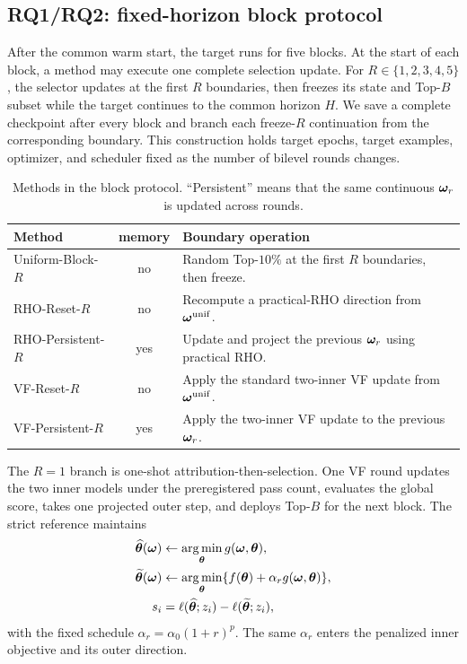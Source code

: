 \subsection{RQ1/RQ2: fixed-horizon block protocol}

After the common warm start, the target runs for five blocks. At the start of
each block, a method may execute one complete selection update. For
$R\in\{1,2,3,4,5\}$, the selector updates at the first $R$ boundaries, then
freezes its state and Top-$B$ subset while the target continues to the common
horizon $H$. We save a complete checkpoint after every block and branch each
freeze-$R$ continuation from the corresponding boundary. This construction
holds target epochs, target examples, optimizer, and scheduler fixed as the
number of bilevel rounds changes.

\begin{table}[h]
\centering
\caption{Methods in the block protocol. ``Persistent'' means that the same
continuous ${\bm{\omega}}_r$ is updated across rounds.}
\label{tab:block-methods}
\small
\begin{tabularx}{\textwidth}{l c X}
\toprule
Method & memory & Boundary operation \\
\midrule
Uniform-Block-$R$ & no & Random Top-$10\%$ at the first $R$ boundaries, then freeze. \\
RHO-Reset-$R$ & no & Recompute a practical-RHO direction from ${\bm{\omega}}^{\mathrm{unif}}$. \\
RHO-Persistent-$R$ & yes & Update and project the previous ${\bm{\omega}}_r$ using practical RHO. \\
VF-Reset-$R$ & no & Apply the standard two-inner VF update from ${\bm{\omega}}^{\mathrm{unif}}$. \\
VF-Persistent-$R$ & yes & Apply the two-inner VF update to the previous ${\bm{\omega}}_r$. \\
\bottomrule
\end{tabularx}
\end{table}

The $R=1$ branch is one-shot attribution-then-selection. One VF round updates
the two inner models under the preregistered pass count, evaluates the global
score, takes one projected outer step, and deploys Top-$B$ for the next block.
The strict reference maintains
\begin{align}
\widehat{{\bm{\theta}}}({\bm{\omega}})&\leftarrow\operatorname*{arg\,min}_{{\bm{\theta}}}g({\bm{\omega}},{\bm{\theta}}),\\
\widetilde{{\bm{\theta}}}({\bm{\omega}})&\leftarrow\operatorname*{arg\,min}_{{\bm{\theta}}}
\{f({\bm{\theta}})+\alpha_r g({\bm{\omega}},{\bm{\theta}})\},\\
s_i&=\ell(\widehat{{\bm{\theta}}};z_i)-\ell(\widetilde{{\bm{\theta}}};z_i),
\end{align}
with the fixed schedule $\alpha_r=\alpha_0(1+r)^p$. The same $\alpha_r$ enters
the penalized inner objective and its outer direction.

